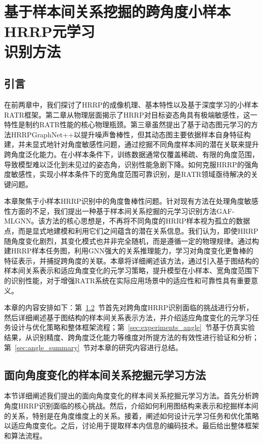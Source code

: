 \chapter[基于样本间关系挖掘的跨角度小样本HRRP元学习识别方法]{基于样本间关系挖掘的跨角度小样本HRRP元学习\protect\\ 识别方法}
\label{chap:angle_robust}

\section{引言}
\label{sec:angle_intro}

在前两章中，我们探讨了HRRP的成像机理、基本特性以及基于深度学习的小样本RATR框架。第二章从物理层面揭示了HRRP对目标姿态角具有极端敏感性，这一特性是制约RATR性能的核心物理瓶颈。第三章虽然提出了基于动态图元学习的方法HRRPGraphNet++以提升噪声鲁棒性，但其动态图主要依据样本自身特征构建，并未显式地针对角度敏感性问题，通过挖掘不同角度样本间的潜在关联来提升跨角度泛化能力。在小样本条件下，训练数据通常仅覆盖稀疏、有限的角度范围，导致模型难以泛化到未见过的姿态角，识别性能急剧下降。如何克服HRRP的强角度敏感性，实现小样本条件下的宽角度范围可靠识别，是RATR领域亟待解决的关键问题。

本章聚焦于小样本HRRP识别中的角度鲁棒性问题。针对现有方法在处理角度敏感性方面的不足，我们提出一种基于样本间关系挖掘的元学习识别方法GAF-MLGNN。该方法的核心思想是，不再将不同角度的HRRP样本视为孤立的数据点，而是显式地建模和利用它们之间蕴含的潜在关系信息。我们认为，即使HRRP随角度变化剧烈，其变化模式也并非完全随机，而是遵循一定的物理规律。通过构建HRRP样本任务图，利用GNN强大的关系推理能力，学习对角度变化更鲁棒的特征表示，并捕捉跨角度的关联。本章将详细阐述该方法，通过引入基于图结构的样本间关系表示和适应角度变化的元学习策略，提升模型在小样本、宽角度范围下的识别性能，对于增强RATR系统在实际应用场景中的适应性和可靠性具有重要意义。

本章的内容安排如下：第~\ref{sec:angle_method}~节首先对跨角度HRRP识别面临的挑战进行分析，然后详细阐述基于图结构的样本间关系表示方法，并介绍适应角度变化的元学习任务设计与优化策略和整体框架流程；第~\ref{sec:experiments_angle}~节基于仿真实验结果，从识别精度、跨角度泛化能力等维度对所提方法的有效性进行验证和分析；第~\ref{sec:angle_summary}~节对本章的研究内容进行总结。

\section{面向角度变化的样本间关系挖掘元学习方法}
\label{sec:angle_method}

本节详细阐述我们提出的面向角度变化的样本间关系挖掘元学习方法。首先分析跨角度HRRP识别面临的核心挑战。然后，介绍如何利用图结构来表示和挖掘样本间的关系，特别是在角度维度上的关系。接着，阐述如何设计元学习任务和优化策略以适应角度变化。之后，讨论用于提取样本内信息的编码技术。最后给出整体框架和算法流程。

